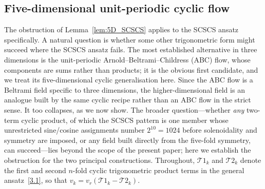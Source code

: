\documentclass[11pt]{jfm}
\numberwithin{equation}{section}
\begin{document}
\subsection{Five-dimensional unit-periodic cyclic flow}
\label{subsec:exhaustive}
The obstruction of Lemma~\ref{lem:5D_SCSCS} applies to the SCSCS ansatz specifically. A
natural question is whether some other trigonometric form might succeed where the SCSCS ansatz
fails. The most established alternative in three dimensions is the unit-periodic Arnold--Beltrami--Childress (ABC) flow,
whose components are sums rather than products; it is the obvious first candidate, and we treat
its five-dimensional cyclic generalisation here. Since the ABC flow is a Beltrami field specific to
three dimensions, the higher-dimensional field is an analogue built by the same cyclic recipe rather
than an ABC flow in the strict sense. It too collapses, as we now show. The broader
question---whether \emph{any} two-term cyclic product, of which the SCSCS pattern is one member
whose unrestricted sine/cosine assignments number $2^{10}=1024$ before solenoidality and symmetry
are imposed, or any field built directly from the five-fold symmetry, can succeed---lies
beyond the scope of the present paper; here we establish the obstruction for the two principal
constructions. Throughout, $\mathcal{T}1_k$ and $\mathcal{T}2_k$ denote the
first and second $n$-fold cyclic trigonometric product terms in the general
ansatz~\eqref{3.1}, so that $v_k = v_r(\mathcal{T}1_k - \mathcal{T}2_k)$.
\end{document}
